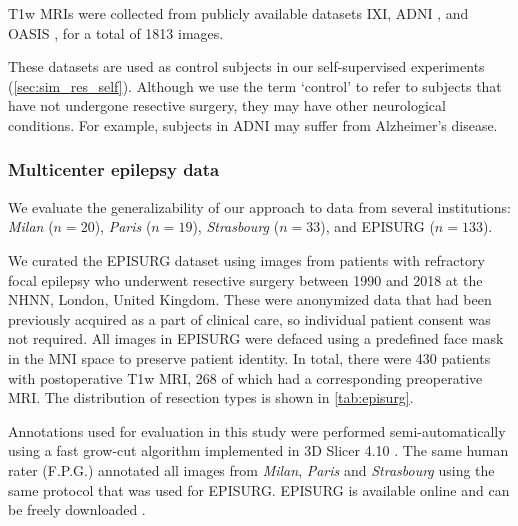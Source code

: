 \ac{T1w} \acp{MRI} were collected from publicly available datasets \ac{IXI}, \ac{ADNI} \cite{jack_alzheimers_2008}, and \ac{OASIS} \cite{lamontagne_oasis-3_2019}, for a total of 1813 images.

These datasets are used as control subjects in our self-supervised experiments (\cref{sec:sim_res_self}).
Although we use the term `control' to refer to subjects that have not undergone resective surgery, they may have other neurological conditions.
For example, subjects in \ac{ADNI} may suffer from Alzheimer's disease.


\subsubsection{Multicenter epilepsy data}
\label{sec:multicenter}

We evaluate the generalizability of our approach to data from several institutions: \textit{Milan} ($n = 20$), \textit{Paris} ($n = 19$), \textit{Strasbourg} ($n = 33$), and EPISURG ($n = 133$).

We curated the EPISURG dataset using images from patients with refractory focal epilepsy who underwent resective surgery between 1990 and 2018 at the \ac{NHNN}, London, United Kingdom.
These were anonymized data that had been previously acquired as a part of clinical care, so individual patient consent was not required.
All images in EPISURG were defaced using a predefined face mask in the \ac{MNI} space to preserve patient identity.
In total, there were 430 patients with postoperative \ac{T1w} \ac{MRI}, 268 of which had a corresponding preoperative \ac{MRI}.
The distribution of resection types is shown in \cref{tab:episurg}.

Annotations used for evaluation in this study were performed semi-automatically using a fast grow-cut algorithm implemented in 3D Slicer 4.10 \cite{zhu_effective_2014,fedorov_3d_2012}.
The same human rater (F.P.G.) annotated all images from \textit{Milan}, \textit{Paris} and \textit{Strasbourg} using the same protocol that was used for EPISURG.
EPISURG is available online and can be freely downloaded \cite{perez-garcia_episurg_2020}%
.


